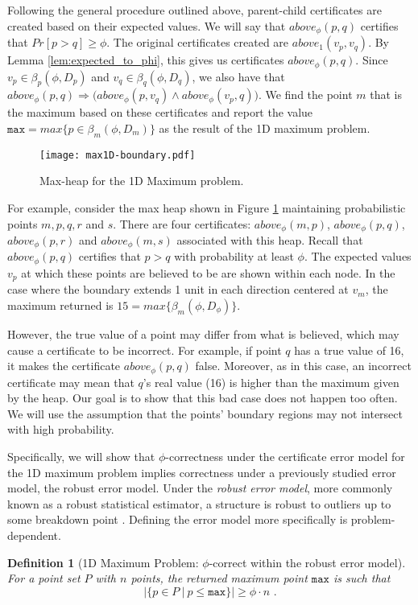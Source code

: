 \documentclass[11pt]{article}
\newtheorem{definition}[theorem]{Definition}
\begin{document}
Following the general procedure outlined above, parent-child certificates are created based on their expected values.  We will say that $above_\phi(p, q)$ certifies that $Pr[p > q] \geq \phi$.  The original certificates created are $above_1(v_p, v_q)$.  By Lemma \ref{lem:expected_to_phi}, this gives us certificates $above_\phi(p, q)$.
Since $v_p \in \beta_p(\phi, D_p)$ and $v_q \in \beta_q(\phi, D_q)$, we also have that
$ above_{\phi}(p,q) \Longrightarrow \big( above_\phi(p, v_q) \land above_\phi(v_p, q) \big) \mbox{.}$
We find the point $m$ that is the maximum based on these certificates and report the value $\texttt{max} = max \{ p \in \beta_m(\phi, D_m) \}$ as the result of the 1D maximum problem.

\begin{figure}[h]
\begin{center}
 \centering
\texttt{[image: max1D-boundary.pdf]}
\caption{Max-heap for the 1D Maximum problem.}
\label{fig:max1D}
\end{center}
\end{figure}

For example, consider the max heap shown in Figure \ref{fig:max1D}
maintaining probabilistic points $m, p, q, r$ and $s$.  There are four
certificates: $above_\phi(m,p)$, $above_\phi(p,q)$, $above_\phi(p,r)$ and $above_\phi(m,s)$
associated with this heap. Recall that $above_\phi(p,q)$ certifies that $p > q$ with probability at least $\phi$.  The
expected values $v_p$ at which these points are believed to be are shown within each
node.  In the case where the boundary extends 1 unit in each direction centered at $v_m$, the maximum returned is $15 = max \{ \beta_m(\phi, D_\phi) \}$.

However, the true value of a point may differ from what is
believed, which may cause a certificate to be incorrect. For example,
if point $q$ has a true value of 16, it makes the certificate
$above_\phi(p,q)$ false. Moreover, as in this case, an incorrect
certificate may mean that $q$'s real value (16) is higher than the
maximum given by the heap.  Our goal is to show that this bad case does not happen too often.  We will use the assumption that the  points' boundary regions may not intersect with high probability.

 
Specifically, we will show that $\phi$-correctness under the certificate error model for the 1D maximum problem implies correctness under a previously studied error model, the robust error model.  Under the \emph{robust error model}, more commonly known as a robust statistical estimator, a structure is robust to outliers up to some breakdown point \cite{Rousseeuw05Robust}.  Defining the error model more specifically is problem-dependent.
\begin{definition}[1D Maximum Problem: $\phi$-correct within the robust error model]
For a point set $P$ with $n$ points, the returned maximum point $\texttt{max}$ is such that
\[ | \{ p \in P ~|~ p \leq \texttt{max} \} | \geq \phi \cdot n \mbox{ .}\]
\end{definition}
\end{document}
